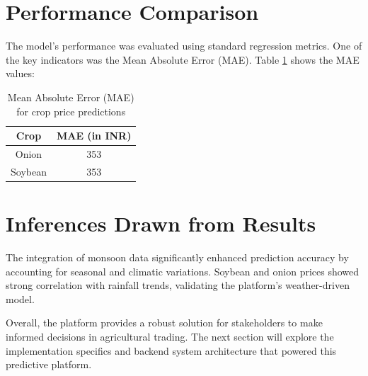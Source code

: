 \section{Performance Comparison}
The model's performance was evaluated using standard regression metrics. One of the key indicators was the Mean Absolute Error (MAE). Table \ref{tab:mae} shows the MAE values:

\begin{table}[H]
	\centering
	\caption{Mean Absolute Error (MAE) for crop price predictions}
	\label{tab:mae}
	\begin{tabular}{|c|c|}
		\hline
		\textbf{Crop} & \textbf{MAE (in INR)} \\
		\hline
		Onion & 353 \\
		Soybean & 353 \\
		\hline
	\end{tabular}
\end{table}

\section{Inferences Drawn from Results}
The integration of monsoon data significantly enhanced prediction accuracy by accounting for seasonal and climatic variations. Soybean and onion prices showed strong correlation with rainfall trends, validating the platform's weather-driven model.

\vspace{1em}
Overall, the platform provides a robust solution for stakeholders to make informed decisions in agricultural trading. The next section will explore the implementation specifics and backend system architecture that powered this predictive platform.